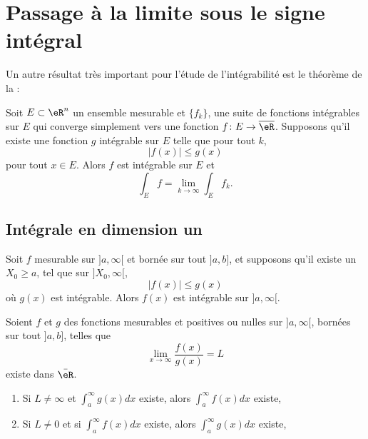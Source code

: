 \section{Passage à la limite sous le signe intégral}


Un autre résultat très important pour l'étude de l'intégrabilité est le théorème de la :
\begin{theorem}
	Soit \( E\subset \eR^n\) un ensemble mesurable et \( \{ f_k \}\), une suite de fonctions intégrables sur \( E\) qui converge simplement vers une fonction \( f\colon E\to \overline{ \eR }\). Supposons qu'il existe une fonction \( g\) intégrable sur \( E\) telle que pour tout \( k\),
	\begin{equation}
		| f(x) |\leq g(x)
	\end{equation}
	pour tout \( x\in E\). Alors \( f\) est intégrable sur \( E\) et
	\begin{equation}
		\int_Ef=\lim_{k\to\infty}\int_Ef_k.
	\end{equation}
\end{theorem}

\subsection{Intégrale en dimension un}

\begin{proposition}
	Soit \( f\) mesurable sur \( ]a,\infty[\) et bornée sur tout \( ]a,b]\), et supposons qu'il existe un \( X_0\geq a\), tel que sur \( ]X_0,\infty[\),
		\begin{equation}
			| f(x) |\leq g(x)
		\end{equation}
		où \( g(x)\) est intégrable. Alors \( f(x)\) est intégrable sur \( ]a,\infty[\).
\end{proposition}

\begin{corollary}
	Soient \( f\) et \( g\) des fonctions mesurables et positives ou nulles sur \( ]a,\infty[\), bornées sur tout \( ]a,b]\), telles que
	\begin{equation}
		\lim_{x\to\infty}\frac{ f(x) }{ g(x) }=L
	\end{equation}
	existe dans \( \bar\eR\).
	\begin{enumerate}
		\item Si \( L\neq\infty\) et \( \int_{a}^{\infty}g(x)dx\) existe, alors \( \int_a^{\infty}f(x)dx\) existe,
		\item Si \( L\neq 0\) et si \( \int_a^{\infty}f(x)dx\) existe, alors \( \int_a^{\infty}g(x)dx\) existe,
	\end{enumerate}
\end{corollary}

